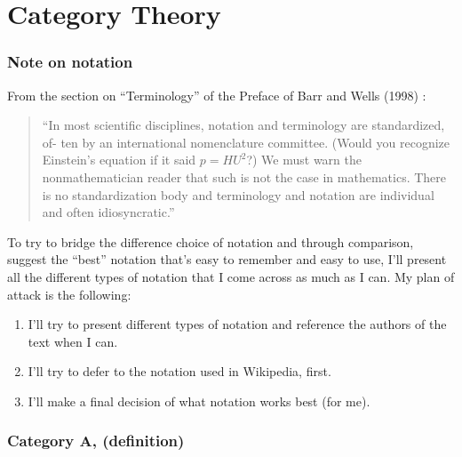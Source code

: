 \part{Category Theory}


\section{Note on notation}

From the section on ``Terminology'' of the Preface of Barr and Wells (1998) \cite{agat:BW1998}:

\begin{quote}
	``In most scientific disciplines, notation and terminology are standardized, of- ten by an international nomenclature committee. (Would you recognize Einstein’s equation if it said $p = HU^2$?) We must warn the nonmathematician reader that such is not the case in mathematics. There is no standardization body and terminology and notation are individual and often idiosyncratic.''
\end{quote}

To try to bridge the difference choice of notation and through comparison, suggest the ``best'' notation that's easy to remember and easy to use, I'll present all the different types of notation that I come across as much as I can. My plan of attack is the following:
\begin{enumerate}
	\item I'll try to present different types of notation and reference the authors of the text when I can.
	\item I'll try to defer to the notation used in Wikipedia, first.
	\item I'll make a final decision of what notation works best (for me).
\end{enumerate}

\section{Category $\mathbf{A}$, (definition)}


